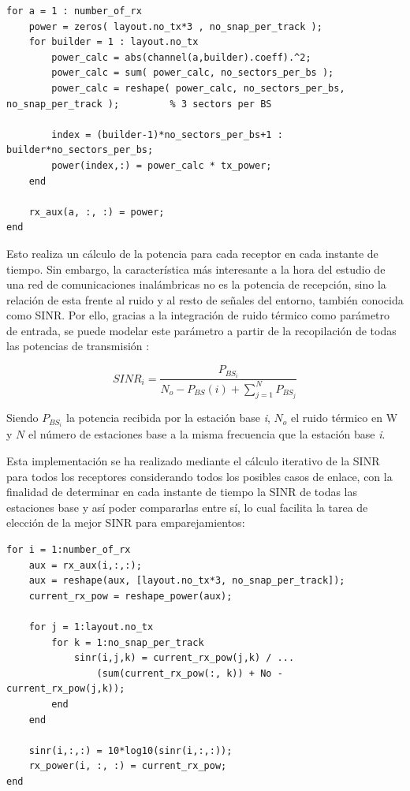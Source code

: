 \begin{lstlisting}[style=Matlab-editor, basicstyle=\tiny]
for a = 1 : number_of_rx
    power = zeros( layout.no_tx*3 , no_snap_per_track );
    for builder = 1 : layout.no_tx
        power_calc = abs(channel(a,builder).coeff).^2;
        power_calc = sum( power_calc, no_sectors_per_bs );
        power_calc = reshape( power_calc, no_sectors_per_bs, no_snap_per_track );         % 3 sectors per BS

        index = (builder-1)*no_sectors_per_bs+1 : builder*no_sectors_per_bs;
        power(index,:) = power_calc * tx_power;
    end

    rx_aux(a, :, :) = power;
end
\end{lstlisting}

Esto realiza un cálculo de la potencia para cada receptor en cada instante de tiempo. Sin embargo, la característica más interesante a la hora del estudio de una red de comunicaciones inalámbricas no es la potencia de recepción, sino la relación de esta frente al ruido y al resto de señales del entorno, también conocida como SINR. Por ello, gracias a la integración de ruido térmico como parámetro de entrada, se puede modelar este parámetro a partir de la recopilación de todas las potencias de transmisión \cite{capacity}:

\[SINR_i = \frac{P_{BS_i}}{N_{o} - P_{BS}(i) + \sum_{j = 1}^{N} P_{BS_j}}\]

Siendo $P_{BS_i}$ la potencia recibida por la estación base \textit{i}, $N_o$ el ruido térmico en W y $N$ el número de estaciones base a la misma frecuencia que la estación base \textit{i}.

Esta implementación se ha realizado mediante el cálculo iterativo de la SINR para todos los receptores considerando todos los posibles casos de enlace, con la finalidad de determinar en cada instante de tiempo la SINR de todas las estaciones base y así poder compararlas entre sí, lo cual facilita la tarea de elección de la mejor SINR para emparejamientos:

\begin{lstlisting}[style=Matlab-editor, basicstyle=\tiny]
for i = 1:number_of_rx
    aux = rx_aux(i,:,:);
    aux = reshape(aux, [layout.no_tx*3, no_snap_per_track]);
    current_rx_pow = reshape_power(aux);

    for j = 1:layout.no_tx
        for k = 1:no_snap_per_track
            sinr(i,j,k) = current_rx_pow(j,k) / ...
                (sum(current_rx_pow(:, k)) + No - current_rx_pow(j,k));
        end
    end

    sinr(i,:,:) = 10*log10(sinr(i,:,:));
    rx_power(i, :, :) = current_rx_pow;
end
\end{lstlisting}

